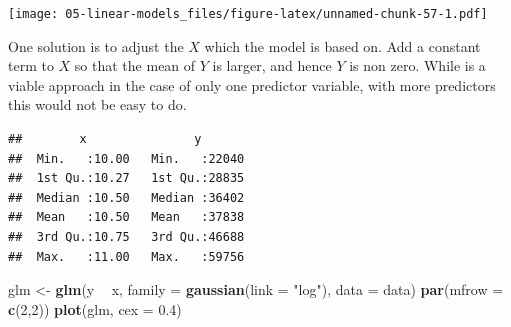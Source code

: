 \documentclass[
  openany]{book}
\newenvironment{Shaded}{\begin{snugshade}}{\end{snugshade}}
\newcommand{\DataTypeTok}[1]{\textcolor[rgb]{0.13,0.29,0.53}{#1}}
\newcommand{\DecValTok}[1]{\textcolor[rgb]{0.00,0.00,0.81}{#1}}
\newcommand{\FloatTok}[1]{\textcolor[rgb]{0.00,0.00,0.81}{#1}}
\newcommand{\KeywordTok}[1]{\textcolor[rgb]{0.13,0.29,0.53}{\textbf{#1}}}
\newcommand{\NormalTok}[1]{#1}
\newcommand{\OperatorTok}[1]{\textcolor[rgb]{0.81,0.36,0.00}{\textbf{#1}}}
\newcommand{\StringTok}[1]{\textcolor[rgb]{0.31,0.60,0.02}{#1}}
\begin{document}
\begin{Shaded}
\end{Shaded}

\texttt{[image: 05-linear-models\_files/figure-latex/unnamed-chunk-57-1.pdf]}

One solution is to adjust the \(X\) which the model is based on. Add a constant term to \(X\) so that the mean of \(Y\) is larger, and hence \(Y\) is non zero. While is a viable approach in the case of only one predictor variable, with more predictors this would not be easy to do.

\begin{Shaded}
\end{Shaded}

\begin{verbatim}
##        x               y        
##  Min.   :10.00   Min.   :22040  
##  1st Qu.:10.27   1st Qu.:28835  
##  Median :10.50   Median :36402  
##  Mean   :10.50   Mean   :37838  
##  3rd Qu.:10.75   3rd Qu.:46688  
##  Max.   :11.00   Max.   :59756
\end{verbatim}

\begin{Shaded}
\begin{Highlighting}[]
\NormalTok{glm <-}\StringTok{ }\KeywordTok{glm}\NormalTok{(y }\OperatorTok{~}\StringTok{ }\NormalTok{x, }\DataTypeTok{family =} \KeywordTok{gaussian}\NormalTok{(}\DataTypeTok{link =} \StringTok{"log"}\NormalTok{), }\DataTypeTok{data =}\NormalTok{ data)}
\KeywordTok{par}\NormalTok{(}\DataTypeTok{mfrow =} \KeywordTok{c}\NormalTok{(}\DecValTok{2}\NormalTok{,}\DecValTok{2}\NormalTok{))}
\KeywordTok{plot}\NormalTok{(glm, }\DataTypeTok{cex =} \FloatTok{0.4}\NormalTok{)}
\end{Highlighting}
\end{Shaded}
\end{document}
